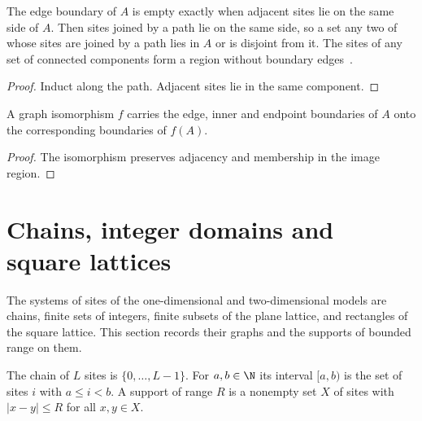 \begin{lemma}
    \label{lem:sites_zero_edge_boundary}
    \leanok
    The edge boundary of $A$ is empty exactly when adjacent sites lie on the same side of
    $A$. Then sites joined by a path lie on the same side, so a set any two of whose sites
    are joined by a path lies in $A$ or is disjoint from it. The sites of any set of
    connected components form a region without boundary edges~\cite{OpenAI2026AreaLaw}.
\end{lemma}
\begin{proof}\leanok
    Induct along the path. Adjacent sites lie in the same component.
\end{proof}

\begin{lemma}
    \label{lem:sites_boundary_map}
    \leanok
    A graph isomorphism $f$ carries the edge, inner and endpoint boundaries of $A$ onto
    the corresponding boundaries of $f(A)$.
\end{lemma}
\begin{proof}\leanok
    The isomorphism preserves adjacency and membership in the image region.
\end{proof}

\section{Chains, integer domains and square lattices}
\label{sec:sites_lattices}

The systems of sites of the one-dimensional and two-dimensional models are
chains, finite sets of integers, finite subsets of the plane lattice, and
rectangles of the square lattice. This section records their graphs and the
supports of bounded range on them.

\begin{definition}
    \label{def:sites_chain_support}
    \leanok
    The chain of $L$ sites is $\{0,\dots,L-1\}$. For $a,b\in\N$ its interval
    $[a,b)$ is the set of sites $i$ with $a\le i<b$. A support of range $R$ is a
    nonempty set $X$ of sites with $|x-y|\le R$ for all $x,y\in X$.
\end{definition}

